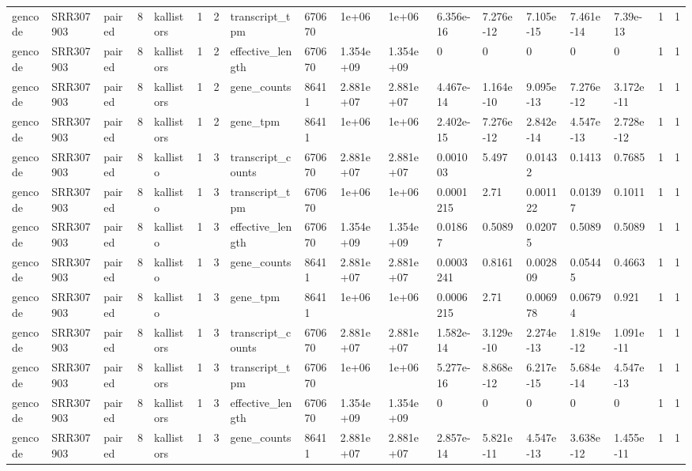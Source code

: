 \begin{tabular}{llllllllllllllllll}
gencode & SRR307903 & paired & 8 & kallistors & 1 & 2 & transcript\_tpm & 670670 & 1e+06 & 1e+06 & 6.356e-16 & 7.276e-12 & 7.105e-15 & 7.461e-14 & 7.39e-13 & 1 & 1 \\
gencode & SRR307903 & paired & 8 & kallistors & 1 & 2 & effective\_length & 670670 & 1.354e+09 & 1.354e+09 & 0 & 0 & 0 & 0 & 0 & 1 & 1 \\
gencode & SRR307903 & paired & 8 & kallistors & 1 & 2 & gene\_counts & 86411 & 2.881e+07 & 2.881e+07 & 4.467e-14 & 1.164e-10 & 9.095e-13 & 7.276e-12 & 3.172e-11 & 1 & 1 \\
gencode & SRR307903 & paired & 8 & kallistors & 1 & 2 & gene\_tpm & 86411 & 1e+06 & 1e+06 & 2.402e-15 & 7.276e-12 & 2.842e-14 & 4.547e-13 & 2.728e-12 & 1 & 1 \\
gencode & SRR307903 & paired & 8 & kallisto & 1 & 3 & transcript\_counts & 670670 & 2.881e+07 & 2.881e+07 & 0.001003 & 5.497 & 0.01432 & 0.1413 & 0.7685 & 1 & 1 \\
gencode & SRR307903 & paired & 8 & kallisto & 1 & 3 & transcript\_tpm & 670670 & 1e+06 & 1e+06 & 0.0001215 & 2.71 & 0.001122 & 0.01397 & 0.1011 & 1 & 1 \\
gencode & SRR307903 & paired & 8 & kallisto & 1 & 3 & effective\_length & 670670 & 1.354e+09 & 1.354e+09 & 0.01867 & 0.5089 & 0.02075 & 0.5089 & 0.5089 & 1 & 1 \\
gencode & SRR307903 & paired & 8 & kallisto & 1 & 3 & gene\_counts & 86411 & 2.881e+07 & 2.881e+07 & 0.0003241 & 0.8161 & 0.002809 & 0.05445 & 0.4663 & 1 & 1 \\
gencode & SRR307903 & paired & 8 & kallisto & 1 & 3 & gene\_tpm & 86411 & 1e+06 & 1e+06 & 0.0006215 & 2.71 & 0.006978 & 0.06794 & 0.921 & 1 & 1 \\
gencode & SRR307903 & paired & 8 & kallistors & 1 & 3 & transcript\_counts & 670670 & 2.881e+07 & 2.881e+07 & 1.582e-14 & 3.129e-10 & 2.274e-13 & 1.819e-12 & 1.091e-11 & 1 & 1 \\
gencode & SRR307903 & paired & 8 & kallistors & 1 & 3 & transcript\_tpm & 670670 & 1e+06 & 1e+06 & 5.277e-16 & 8.868e-12 & 6.217e-15 & 5.684e-14 & 4.547e-13 & 1 & 1 \\
gencode & SRR307903 & paired & 8 & kallistors & 1 & 3 & effective\_length & 670670 & 1.354e+09 & 1.354e+09 & 0 & 0 & 0 & 0 & 0 & 1 & 1 \\
gencode & SRR307903 & paired & 8 & kallistors & 1 & 3 & gene\_counts & 86411 & 2.881e+07 & 2.881e+07 & 2.857e-14 & 5.821e-11 & 4.547e-13 & 3.638e-12 & 1.455e-11 & 1 & 1 \\

\end{tabular}
